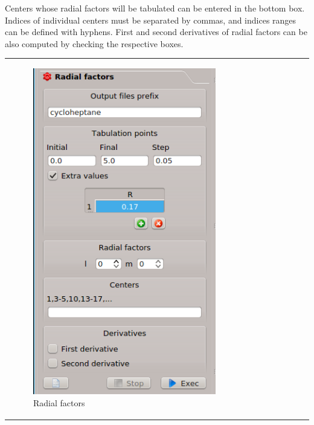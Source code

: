 \documentclass[10pt]{article}
\begin{document}
Centers whose radial factors
will be tabulated can be entered in the bottom box. Indices of individual centers must be separated by commas, and indices ranges can be defined with hyphens. 
First and second derivatives of radial factors can be also computed by 
checking the respective boxes.

\begin{tabular}{lcr}
\hspace*{-3mm}
\begin{minipage}{.3\linewidth}
\begin{figure}[H]
\begin{center}
\includegraphics[width=.7\linewidth]{damqt_fig_2_11.png}
\end{center}
\caption{{Radial factors}\label{fig:2_11}}
\end{figure}
\end{minipage}
&
\begin{minipage}{.3\linewidth}
\begin{figure}[H]
\begin{center}
\vspace*{5mm}

\end{center}
\end{figure}
\end{minipage}
\end{tabular}
\end{document}
